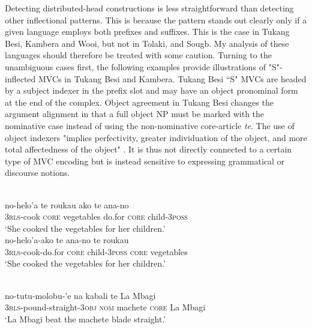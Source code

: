 Detecting distributed-head constructions is less straightforward than detecting other inflectional patterns. This is because the pattern stands out clearly only if a given language employs both prefixes and suffixes. This is the case in Tukang Besi, Kambera and Wooi, but not in Tolaki, and Sougb. My analysis of these languages should therefore be treated with some caution. Turning to the unambiguous cases first, the following examples provide illustrations of "S"-inflected MVCs in Tukang Besi and Kambera. Tukang Besi ``S" MVCs are headed by a subject indexer in the prefix slot and may have an object pronominal form at the end of the complex. Object agreement in Tukang Besi changes the argument alignment in that a full object NP must be marked with the nominative case instead of using the non-nominative core-article \textit{te}. The use of object indexers "implies perfectivity, greater individuation of the object, and more total affectedness of the object" \citep[135]{donohue1999}. It is thus not directly connected to a certain type of MVC encoding but is instead sensitive to expressing grammatical or discourse notions.

\ea \label{tukang001}
\\
\ea
\gll no-helo'a te roukau ako te ana-no \\
3\textsc{rls}-cook \textsc{core} vegetables do.for \textsc{core} child-3\textsc{poss} \\
\glft `She cooked the vegetables for her children.' \\ 
\ex \label{tukang001b}
\gll no-helo'a-ako te ana-no te roukau \\ 
3\textsc{rls}-cook-do.for \textsc{core} child-3\textsc{poss} \textsc{core} vegetables \\
\glft `She cooked the vegetables for her children.' \\ 
\z
\z

\ea \label{tukang002}
\\
\gll no-tutu-molobu-'e na kabali te La Mbagi \\
3\textsc{rls}-pound-straight-3\textsc{obj} \textsc{nom} machete \textsc{core} La Mbagi \\
\glft `La Mbagi beat the machete blade straight.' \\ 
\z


